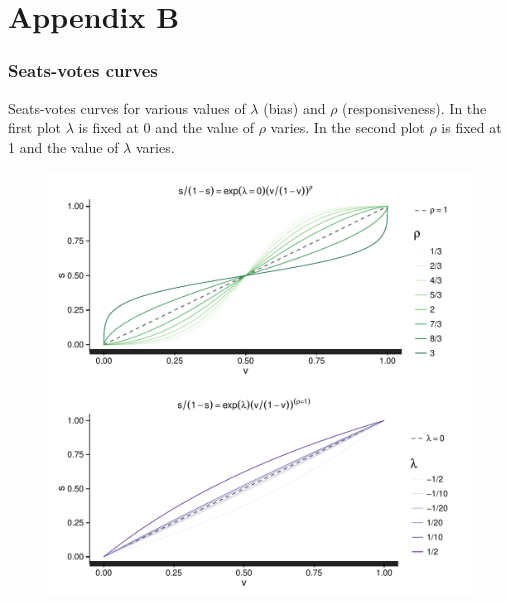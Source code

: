 \chapter*{Appendix B}\label{AppendixB}
\vspace{-1.75cm}
\subsection{Seats-votes curves}

Seats-votes curves for various values of $\lambda$ (bias) and $\rho$ (responsiveness). 
In the first plot $\lambda$ is fixed at 0 and the value of $\rho$ varies. In the second plot 
$\rho$ is fixed at 1 and the value of $\lambda$ varies. 

\begin{figure}[h]
\centering
	\includegraphics[scale=0.8]{sections/figs/seats_votes}
\label{fig:seats_votes}
\end{figure}


